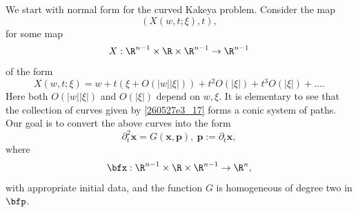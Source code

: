 \documentclass{article}
\numberwithin{equation}{section}
\theoremstyle{plain}
\begin{document}
  We start with normal form for the curved Kakeya problem. Consider the map 
\begin{equation}\label{260527e3_17}
(X(w, t; \xi), t),
\end{equation}
for some map 
\begin{equation}
X: \R^{n-1}\times \R\times \R^{n-1}\to \R^{n-1}
\end{equation}
of the form 
\begin{equation}\label{250227e6_3}
X(w, t; \xi)= 
w+ t(\xi+ O(|w||\xi|))+ t^2 O(|\xi|)+ t^3 O(|\xi|)+\dots.
\end{equation}
Here both $O(|w||\xi|)$ and $O(|\xi|)$ depend on $w, \xi$. It is elementary to see that the collection of curves given by \eqref{260527e3_17} forms a conic system of paths. Our goal is to convert the above curves into the form 
\begin{equation}\label{250227e6_4}
\partial_t^2 \mathbf{x}= G(\mathbf{x}, \mathbf{p}), \ \mathbf{p}:= \partial_t \mathbf{x},
\end{equation}
where 
\begin{equation}
\bfx: \R^{n-1}\times \R\times \R^{n-1}\to \R^n,
\end{equation}
with appropriate initial data, and the function $G$  is homogeneous of degree two in $\bfp$. \\ 
\end{document}
